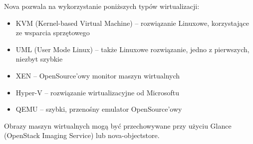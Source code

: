 Nova pozwala na wykorzystanie poniższych typów wirtualizacji\cite{nova_manual}:

\begin{itemize}
\item KVM (Kernel-based Virtual Machine) -- rozwiązanie Linuxowe, korzystające ze wsparcia sprzętowego
\item UML (User Mode Linux) -- także Linuxowe rozwiązanie, jedno z pierwszych, niezbyt szybkie
\item XEN -- OpenSource'owy monitor maszyn wirtualnych
\item Hyper-V -- rozwiązanie wirtualizacyjne od Microsoftu
\item QEMU -- szybki, przenośny emulator OpenSource'owy
\end{itemize}

Obrazy maszyn wirtualnych mogą być przechowywane przy użyciu Glance (OpenStack Imaging Service) lub nova-objectstore.



	

